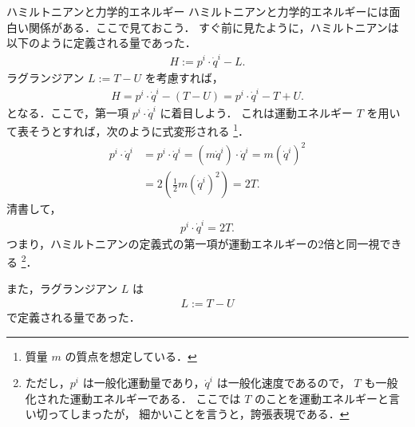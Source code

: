                 \begin{mysmallsec}{ハミルトニアンと力学的エネルギー}
                    ハミルトニアンと力学的エネルギーには面白い関係がある．ここで見ておこう．
                    すぐ前に見たように，ハミルトニアンは以下のように定義される量であった．
                        \begin{align*}
                            H := {p}^{i} \cdot \dot{q}^{i} - L.
                        \end{align*}
                    ラグランジアン $L:=T-U$ を考慮すれば，
                        \begin{align*}
                            H = {p}^{i} \cdot \dot{q}^{i} - ( T - U ) = {p}^{i} \cdot \dot{q}^{i} - T + U.
                        \end{align*}
                    となる．ここで，第一項 ${p}^{i} \cdot \dot{q}^{i}$ に着目しよう．
                    これは運動エネルギー $T$ を用いて表そうとすれば，次のように式変形される
                        \footnote{
                            質量 $m$ の質点を想定している．
                        }．
                        \begin{align*}
                             {p}^{i} \cdot \dot{q}^{i}
                                   &= {p}^{i} \cdot \dot{q}^{i} = (m \dot{q}^{i}) \cdot \dot{q}^{i} = m (\dot{q}^{i})^{2} \\
                                   &= 2 \left( \frac{1}{2} m (\dot{q}^{i})^{2}\right) = 2 T.
                        \end{align*}
                                        清書して，
                        \begin{align}
                             {p}^{i} \cdot \dot{q}^{i} = 2 T.
                        \end{align}
                    つまり，ハミルトニアンの定義式の第一項が運動エネルギーの2倍と同一視できる
                        \footnote{
                            ただし，${p}^{i}$ は一般化運動量であり，$\dot{q}^{i}$ は一般化速度であるので，
                            $T$ も一般化された運動エネルギーである．
                            ここでは $T$ のことを運動エネルギーと言い切ってしまったが，
                            細かいことを言うと，誇張表現である．
                        }．

                                        また，ラグランジアン $L$ は
                        \begin{align}
                             L := T - U
                        \end{align}
                                        で定義される量であった．


\end{mysmallsec}
